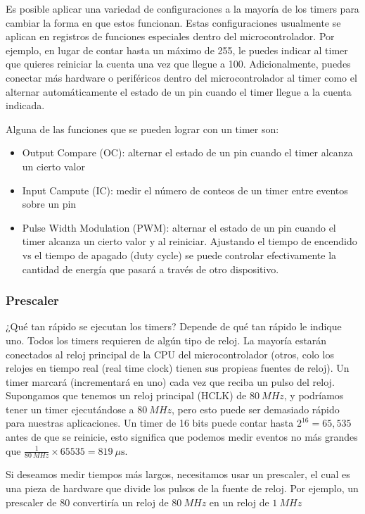 \documentclass[12pt,a4paper]{book}
\begin{document}
	 \noindent Es posible aplicar una variedad de configuraciones a la mayoría de los timers para cambiar la forma en que estos funcionan. Estas configuraciones usualmente se aplican en registros de funciones especiales dentro del microcontrolador. Por ejemplo, en lugar de contar hasta un máximo de 255, le puedes indicar al timer que quieres reiniciar la cuenta una vez que llegue a 100. Adicionalmente, puedes conectar más hardware o periféricos dentro del microcontrolador al timer como el alternar automáticamente el estado de un pin cuando el timer llegue a la cuenta indicada.
	 
	 \noindent Alguna de las funciones que se pueden lograr con un timer son:
	 \begin{itemize}[noitemsep]
	 	\item Output Compare (OC): alternar el estado de un pin cuando el timer alcanza un cierto valor
	 	\item Input Campute (IC): medir el número de conteos de un timer entre eventos sobre un pin
	 	\item Pulse Width Modulation (PWM): alternar el estado de un pin cuando el timer alcanza un cierto valor y al reiniciar. Ajustando el tiempo de encendido vs el tiempo de apagado (duty cycle) se puede controlar efectivamente la cantidad de energía que pasará a través de otro dispositivo. 
	 \end{itemize}
	 
	 \subsubsection{Prescaler}
	 ¿Qué tan rápido se ejecutan los timers? Depende de qué tan rápido le indique uno. Todos los timers requieren de algún tipo de reloj. La mayoría estarán conectados al reloj principal de la CPU del microcontrolador (otros, colo los relojes en tiempo real (real time clock) tienen sus propieas fuentes de reloj). Un timer marcará (incrementará en uno) cada vez que reciba un pulso del reloj. \\
	 
	 \noindent Supongamos que tenemos un reloj principal (HCLK) de  $\SI{80}{MHz}$, y podríamos tener un timer ejecutándose a  $\SI{80}{MHz}$, pero esto puede ser demasiado rápido para nuestras aplicaciones. Un timer de 16 bits puede contar hasta $2^{16}=65,535$ antes de que se reinicie, esto significa que podemos medir eventos no más grandes que $\frac{1}{ \SI{80}{MHz}}\times 65535 = \SI{819}{\mu\s}$.
	 
	 \noindent Si deseamos medir tiempos más largos, necesitamos usar un prescaler, el cual es una pieza de hardware que divide los pulsos de la fuente de reloj. Por ejemplo, un prescaler de 80 convertiría un reloj de $\SI{80}{MHz}$ en un reloj de $\SI{1}{MHz}$
	 
\end{document}
